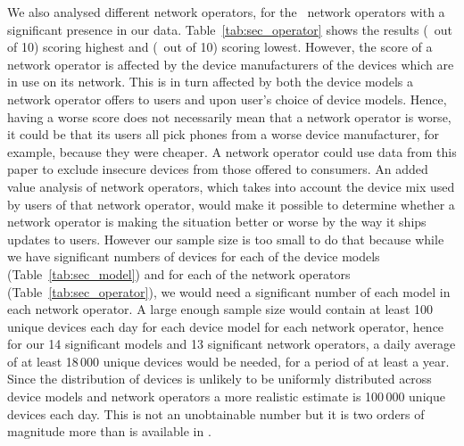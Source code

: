 We also analysed different network operators, for the \daNumSigOperators\ network operators with a significant presence in our data.
Table~\ref{tab:sec_operator} shows the results \emph{\daSecScoreBestoperator} (\daSecScoreBestoperatorScore\ out of 10) scoring highest and \emph{\daSecScoreWorstoperator} (\daSecScoreWorstoperatorScore\ out of 10) scoring lowest.
However, the score of a network operator is affected by the device manufacturers of the devices which are in use on its network.
This is in turn affected by both the device models a network operator offers to users and upon user's choice of device models.
Hence, having a worse score does not necessarily mean that a network operator is worse, it could be that its users all pick phones from a worse device manufacturer, for example, because they were cheaper.
A network operator could use data from this paper to exclude insecure devices from those offered to consumers.
An added value analysis of network operators, which takes into account the device mix used by users of that network operator, would make it possible to determine whether a network operator is making the situation better or worse by the way it ships updates to users.
However our sample size is too small to do that because while we have significant numbers of devices for each of the device models (Table~\ref{tab:sec_model}) and for each of the network operators (Table~\ref{tab:sec_operator}), we would need a significant number of each model in each network operator.
A large enough sample size would contain at least 100 unique devices each day for each device model for each network operator, hence for our 14 significant models and 13 significant network operators, a daily average of at least 18\,000 unique devices would be needed, for a period of at least a year.
Since the distribution of devices is unlikely to be uniformly distributed across device models and network operators a more realistic estimate is 100\,000 unique devices each day.
This is not an unobtainable number but it is two orders of magnitude more than is available in \da.

